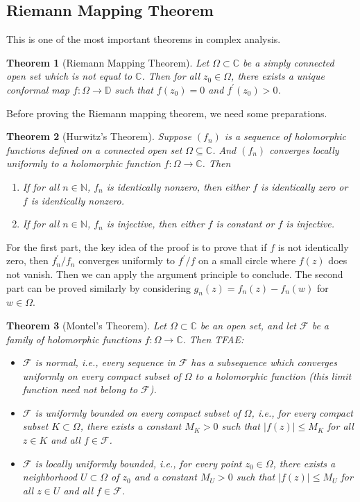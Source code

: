 \documentclass{article}
\newtheorem{theorem}{Theorem}[section]
\theoremstyle{definition}
\newcommand{\N}{\mathbb{N}}
\newcommand{\C}{\mathbb{C}}
\renewcommand{\leq}{\leqslant}
\begin{document}
\subsection{Riemann Mapping Theorem}
This is one of the most important theorems in complex analysis.
\begin{theorem}[Riemann Mapping Theorem]
Let \(\Omega\subset\C\) be a simply connected open set which is not equal to \(\C\). Then for all \(z_0\in\Omega\), there exists a unique conformal map \(f\colon\Omega\to\mathbb{D}\) such that \(f(z_0)=0\) and \(f^{\prime}(z_0)>0\).
\end{theorem}
Before proving the Riemann mapping theorem, we need some preparations.
\begin{theorem}[Hurwitz's Theorem]
    Suppose $(f_n)$ is a sequence of holomorphic functions defined on a connected open set $\Omega\subseteq \C$. And $(f_n)$ converges locally uniformly to a holomorphic function $f\colon \Omega\to\C$. Then
    \begin{enumerate}
        \item If for all $n\in \N$, $f_n$ is identically nonzero, then either $f$ is identically zero or $f$ is identically nonzero.
        \item If for all $n\in \N$, $f_n$ is injective, then either $f$ is constant or $f$ is injective.
    \end{enumerate} 
\end{theorem}
For the first part, the key idea of the proof is to prove that if $f$ is not identically zero, then $f_n^{\prime}/f_n$ converges uniformly to $f^{\prime}/f$ on a small circle where $f(z)$ does not vanish. Then we can apply the argument principle to conclude. 
The second part can be proved similarly by considering $g_n(z)=f_n(z)-f_n(w)$ for $w\in \Omega$.
\begin{theorem}[Montel's Theorem]
    Let \(\Omega\subset\C\) be an open set, and let \(\mathcal{F}\) be a family of holomorphic functions \(f\colon\Omega\to\C\). Then TFAE: 
    \begin{itemize}
        \item \(\mathcal{F}\) is normal, i.e., every sequence in \(\mathcal{F}\) has a subsequence which converges uniformly on every compact subset of \(\Omega\) to a holomorphic function (this limit function need not belong to $\mathcal{F}$).
        \item \(\mathcal{F}\) is uniformly bounded on every compact subset of \(\Omega\), i.e., for every compact subset \(K\subset\Omega\), there exists a constant \(M_K>0\) such that \(|f(z)|\leq M_K\) for all \(z\in K\) and all \(f\in \mathcal{F}\).
        \item \(\mathcal{F}\) is locally uniformly bounded, i.e., for every point \(z_0\in\Omega\), there exists a neighborhood \(U\subset\Omega\) of \(z_0\) and a constant \(M_{U}>0\) such that \(|f(z)|\leq M_{U}\) for all \(z\in U\) and all \(f\in \mathcal{F}\).
    \end{itemize}
\end{theorem}
\end{document}
